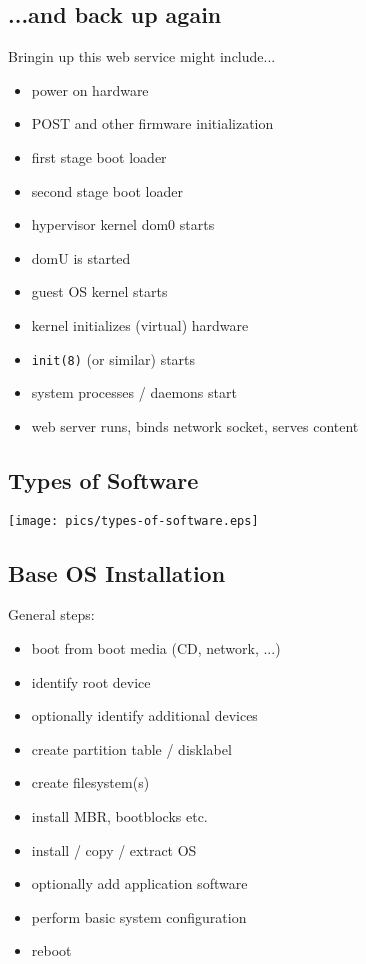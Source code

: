 \documentclass[xga]{xdvislides}
\begin{document}
\subsection{...and back up again}
Bringin up this web service might include...
\\

\begin{itemize}
	\item power on hardware
	\item POST and other firmware initialization
	\item first stage boot loader
	\item second stage boot loader
	\item hypervisor kernel dom0 starts
	\item domU is started
	\item guest OS kernel starts
	\item kernel initializes (virtual) hardware
	\item {\tt init(8)} (or similar) starts
	\item system processes / daemons start
	\item web server runs, binds network socket, serves content
\end{itemize}

\subsection{Types of Software}
\vfill
\begin{center}
	\texttt{[image: pics/types-of-software.eps]}
\end{center}
\vfill

\subsection{Base OS Installation}
General steps:
\begin{itemize}
	\item boot from boot media (CD, network, ...)
	\item identify root device
	\item optionally identify additional devices
	\item create partition table / disklabel
	\item create filesystem(s)
	\item install MBR, bootblocks etc.
	\item install / copy / extract OS
	\item optionally add application software
	\item perform basic system configuration
	\item reboot
\end{itemize}
\end{document}
